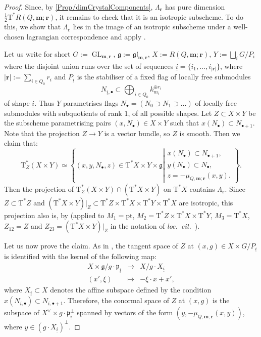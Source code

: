 \documentclass[a4paper,12pt]{article}
\theoremstyle{definition}
\theoremstyle{plain}
\theoremstyle{remark}
\DeclareMathOperator{\GL}{GL}
\newcommand\bfm{\mathbf{m}}
\newcommand\bfr{\mathbf{r}}
\begin{document}
\begin{proof}
Since, by \cref{Prop/dimCrystalComponents}, $\Lambda_\bfr$ has pure dimension $\frac{1}{2}\mathrm{T}^*R(Q,\bfm;\bfr)$, it remains to check that it is an isotropic subscheme. To do this, we show that $\Lambda_\bfr$ lies in the image of an isotropic subscheme under a well-chosen lagrangian correspondence and apply \cite[Prop.\ 1.3.30, Prop.\ 2.7.51]{CG97}.

Let us write for short $G:=\GL_{\bfm,\bfr}$, $\mathfrak{g}:=\mathfrak{gl}_{\bfm,\bfr}$, $X:=R(Q,\bfm;\bfr)$, $Y:=\bigsqcup_{\underline{i}}G/P_{\underline{i}}$ where the disjoint union runs over the set of sequences $\underline{i}=\{i_1,\ldots,i_{\vert\bfr\vert}\}$, where $\vert\bfr\vert:=\sum_{i\in Q_0}r_i$ and $P_{\underline{i}}$ is the stabiliser of a fixed flag of locally free submodules
\[
N_{\underline{i},\bullet}\subset\bigoplus_{i\in Q_0}k_{m_i}^{\oplus r_i}
\]
of shape $\underline{i}$. Thus $Y$ parametrises flags $N_\bullet=(N_0\supset N_1\supset\ldots)$ of locally free submodules with subquotients of rank $1$, of all possible shapes. Let $Z\subset X\times Y$ be the subscheme parametrising pairs $(x,N_\bullet)\in X\times Y$ such that $x(N_\bullet)\subset N_{\bullet+1}$. Note that the projection $Z\rightarrow Y$ is a vector bundle, so $Z$ is smooth. Then we claim that:
\[
\mathrm{T}_Z^*(X\times Y)
\simeq
\left\{
(x,y,N_\bullet,z)\in\mathrm{T}^*X\times Y\times\mathfrak{g}
\left\vert
\begin{array}{l}
x(N_\bullet)\subset N_{\bullet+1}, \\
y(N_\bullet)\subset N_\bullet, \\
z=-\mu_{Q,\bfm;\bfr}(x,y).
\end{array}
\right.
\right\}
.
\]
Then the projection of $\mathrm{T}_Z^*(X\times Y)\cap (\mathrm{T}^*X\times Y)$ on $\mathrm{T}^*X$ contains $\Lambda_\bfr$. Since $Z\subset\mathrm{T}^*Z$ and $(\mathrm{T}^*X\times Y)\vert_Z\subset\mathrm{T}^*Z\times\mathrm{T}^*X\times\mathrm{T}^*Y\times\mathrm{T}^*X$ are isotropic, this projection also is, by \cite[Prop.\ 2.7.51]{CG97} (applied to $M_1=\mathrm{pt}$, $M_2=\mathrm{T}^*Z\times\mathrm{T}^*X\times\mathrm{T}^*Y$, $M_3=\mathrm{T}^*X$, $Z_{12}=Z$ and $Z_{23}=(\mathrm{T}^*X\times Y)\vert_Z$ in the notation of \emph{loc.\ cit.\ }).

Let us now prove the claim. As in \cite[\S 13.4]{Lus91}, the tangent space of $Z$ at $(x,g)\in X\times G/P_{\underline{i}}$ is identified with the kernel of the following map:
\[
\begin{array}{rcl}
X\times\mathfrak{g}/g\cdot\mathfrak{p}_{\underline{i}} & \rightarrow & X/g\cdot X_{\underline{i}}\\
(x',\xi) & \mapsto & -\xi\cdot x+x'
,
\end{array}
\]
where $X_{\underline{i}}\subset X$ denotes the affine subspace defined by the condition $x(N_{\underline{i},\bullet})\subset N_{\underline{i},\bullet+1}$. Therefore, the conormal space of $Z$ at $(x,g)$ is the subspace of $X^\vee\times g\cdot\mathfrak{p}_{\underline{i}}^\perp$ spanned by vectors of the form $(y,-\mu_{Q,\bfm;\bfr}(x,y))$, where $y\in (g\cdot X_{\underline{i}})^\perp$.
\end{proof}
\end{document}
